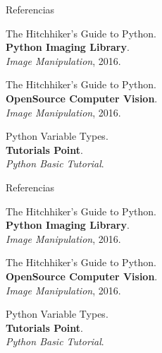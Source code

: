 \documentclass[usenames,dvipsnames]{beamer}
\begin{document}
  \begin{frame}{Referencias}
    \begin{enumerate}[{[}1{]}]
      \addtocounter{enumi}{3}

      \item The Hitchhiker's Guide to Python.\\
      \textbf{Python Imaging Library}.\\
      \textit{Image Manipulation}, 2016.

      \item The Hitchhiker's Guide to Python.\\
      \textbf{OpenSource Computer Vision}.\\
      \textit{Image Manipulation}, 2016.

      \item Python Variable Types.\\
      \textbf{Tutorials Point}.\\
      \textit{Python Basic Tutorial}.
    \end{enumerate}
  \end{frame}

  \begin{frame}{Referencias}
    \begin{enumerate}[{[}1{]}]
      \addtocounter{enumi}{3}

      \item The Hitchhiker's Guide to Python.\\
      \textbf{Python Imaging Library}.\\
      \textit{Image Manipulation}, 2016.

      \item The Hitchhiker's Guide to Python.\\
      \textbf{OpenSource Computer Vision}.\\
      \textit{Image Manipulation}, 2016.

      \item Python Variable Types.\\
      \textbf{Tutorials Point}.\\
      \textit{Python Basic Tutorial}.
    \end{enumerate}
  \end{frame}
\end{document}
